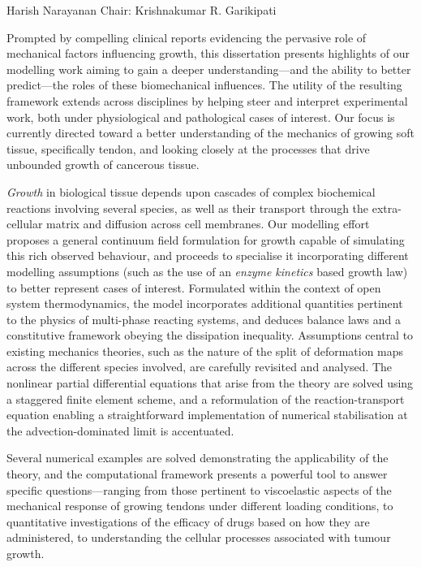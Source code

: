  {Harish Narayanan} {Chair: Krishnakumar
  R. Garikipati}

Prompted by compelling clinical reports evidencing the pervasive role
of mechanical factors influencing growth, this dissertation presents
highlights of our modelling work aiming to gain a deeper
understanding---and the ability to better predict---the roles of these
biomechanical influences. The utility of the resulting framework
extends across disciplines by helping steer and interpret experimental
work, both under physiological and pathological cases of interest. Our
focus is currently directed toward a better understanding of the
mechanics of growing soft tissue, specifically tendon, and looking
closely at the processes that drive unbounded growth of cancerous
tissue.

{\em Growth} in biological tissue depends upon cascades of complex
biochemical reactions involving several species, as well as their
transport through the extra-cellular matrix and diffusion across cell
membranes. Our modelling effort proposes a general continuum field
formulation for growth capable of simulating this rich observed
behaviour, and proceeds to specialise it incorporating different
modelling assumptions (such as the use of an {\sl enzyme kinetics}
based growth law) to better represent cases of interest. Formulated
within the context of open system thermodynamics, the model
incorporates additional quantities pertinent to the physics of
multi-phase reacting systems, and deduces balance laws and a
constitutive framework obeying the dissipation inequality. Assumptions
central to existing mechanics theories, such as the nature of the
split of deformation maps across the different species involved, are
carefully revisited and analysed. The nonlinear partial differential
equations that arise from the theory are solved using a staggered
finite element scheme, and a reformulation of the reaction-transport
equation enabling a straightforward implementation of numerical
stabilisation at the advection-dominated limit is accentuated.

Several numerical examples are solved demonstrating the applicability
of the theory, and the computational framework presents a powerful
tool to answer specific questions---ranging from those pertinent to
viscoelastic aspects of the mechanical response of growing tendons
under different loading conditions, to quantitative investigations of
the efficacy of drugs based on how they are administered, to
understanding the cellular processes associated with tumour growth.

\thispagestyle{empty}
